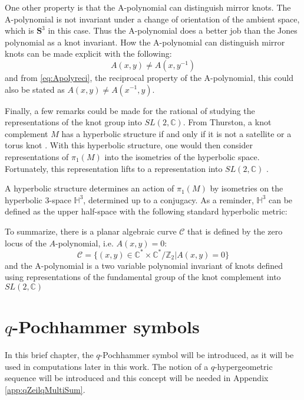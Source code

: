 \documentclass[a4paper,titlepage,twoside]{book}
\begin{document}
One other property is that the A-polynomial can distinguish mirror knots.  The A-polynomial is not invariant under a change of orientation of the ambient space, which is $\mathbf{S}^3$ in this case.  Thus the A-polynomial does a better job than the Jones polynomial as a knot invariant.  How the A-polynomial can distinguish mirror knots can be made explicit with the following:
\begin{equation}
A(x,y) \neq A(x,y^{-1})
\end{equation}
and from \eqref{eq:Apolyreci}, the reciprocal property of the A-polynomial, this could also be stated as $A(x,y) \neq A(x^{-1},y)$.  

Finally, a few remarks could be made for the rational of studying the representations of the knot group into $SL{(2,\mathbb{C})}$.  From Thurston, a knot complement $M$ has a hyperbolic structure if and only if it is not a satellite or a torus knot \cite{Thurston1977}.  With this hyperbolic structure, one would then consider representations of $\pi_1{(M)}$ into the isometries of the hyperbolic space.  Fortunately, this representation lifts to a representation into $SL{(2,\mathbb{C})}$ \cite{CooperLong1996}.

A hyperbolic structure determines an action of $\pi_1{( M)}$ by isometries on the hyperbolic 3-space $\mathbb{H}^3$, determined up to a conjugacy.  As a reminder, $\mathbb{H}^3$ can be defined as the upper half-space with the following standard hyperbolic metric:




To summarize, there is a planar algebraic curve $\mathcal{C}$ that is defined by the zero locus of the $A$-polynomial, i.e. $A(x,y) =0$:
\begin{equation}
\mathcal{C} = \lbrace (x,y) \in \mathbb{C}^* \times \mathbb{C}^*/\mathbb{Z}_2 | A(x,y) = 0 \rbrace \label{eq:algcurveApoly}
\end{equation}
and the A-polynomial is a two variable polynomial invariant of knots defined using representations of the fundamental group of the knot complement into $SL{(2,\mathbb{C})}$








\chapter{$q$-Pochhammer symbols} \label{chap:qPochhammersymbol}

In this brief chapter, the $q$-Pochhammer symbol will be introduced, as it will be used in computations later in this work.  The notion of a $q$-hypergeometric sequence will be introduced and this concept will be needed in Appendix \ref{app:qZeilqMultiSum}.
\end{document}
